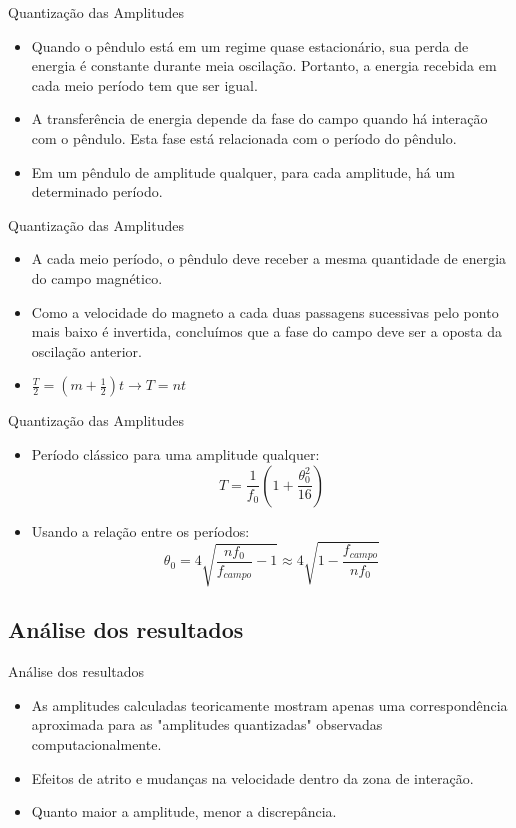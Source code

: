 \documentclass{beamer}
\begin{document}
\begin{frame}{Quantização das Amplitudes}
\begin{itemize}
\item Quando o pêndulo está em um regime quase estacionário, sua perda de energia é constante durante meia oscilação. Portanto, a energia recebida em cada meio período tem que ser igual. 
\item A transferência de energia depende da fase do campo quando há interação com o pêndulo. Esta fase está relacionada com o período do pêndulo.
\item Em um pêndulo de amplitude qualquer, para cada amplitude, há um determinado período.
\end{itemize}
\end{frame}

\begin{frame}{Quantização das Amplitudes}
\begin{itemize}
\item A cada meio período, o pêndulo deve receber a mesma quantidade de energia do campo magnético.  
\item Como a velocidade do magneto a cada duas passagens sucessivas pelo ponto mais baixo é invertida, concluímos que a fase do campo deve ser a oposta da oscilação anterior. 
\item  $\frac{T}{2} = (m + \frac{1}{2})t \rightarrow T = nt$
\end{itemize}
\end{frame}

\begin{frame}{Quantização das Amplitudes}
\begin{itemize}
\item Período clássico para uma amplitude qualquer:$$T = \frac{1}{f_0}\left(1 + \frac{\theta_0^2}{16}\right)$$ 
\item Usando a relação entre os períodos: $$ \theta_0 =  4\sqrt{\frac{n f_0}{f_{campo}} - 1} \approx 4\sqrt{1-\frac{f_{campo}}{n f_0}}$$
\end{itemize}
\end{frame}

\subsection{Análise dos resultados}
\begin{frame}{Análise dos resultados}
\begin{itemize}
\item As amplitudes calculadas teoricamente mostram apenas uma correspondência aproximada para as "amplitudes quantizadas" observadas computacionalmente.
\item Efeitos de atrito e mudanças na velocidade dentro da zona de interação.
\item Quanto maior a amplitude, menor a discrepância.
\end{itemize}
\end{frame}
\end{document}
